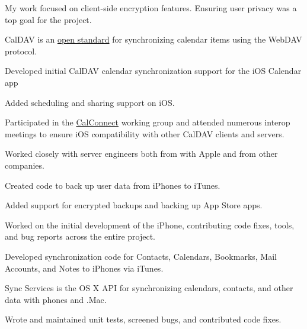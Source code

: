 \begin{cventries}
{\begin{cvsubentries}
{\begin{cvitems}
			\item {My work focused on client-side encryption features. Ensuring user privacy was a top goal for the project.}
         	 \end{cvitems}
        		}
       		{CalDAV is an \href{https://tools.ietf.org/html/rfc4791}{open standard} for synchronizing calendar items using the WebDAV protocol.
		\vspace{2.0mm}
		\begin{cvitems}
         		\item {Developed initial CalDAV calendar synchronization support for the iOS Calendar app}
			\item {Added scheduling and sharing support on iOS.} 
         		\item {Participated in the \href{https://www.calconnect.org}{CalConnect} working group and attended numerous interop meetings to ensure iOS compatibility with other CalDAV clients and servers.}
			\item {Worked closely with server engineers both from with Apple and from other companies.}
         	 \end{cvitems}
        		}
       		{
		\vspace{-2.0mm}
		\begin{cvitems}
         		\item {Created code to back up user data from iPhones to iTunes.}
			\item {Added support for encrypted backups and backing up App Store apps.}
         	 \end{cvitems}
        		}
       		{
		\vspace{-2.0mm}
		\begin{cvitems}
			\item {Worked on the initial development of the iPhone, contributing code fixes, tools, and bug reports across the entire project.}
         		\item {Developed synchronization code for Contacts, Calendars, Bookmarks, Mail Accounts, and Notes to iPhones via iTunes.}
         	 \end{cvitems}
        		}
       		{Sync Services is the OS X API for synchronizing calendars, contacts, and other data with phones and .Mac.
		\vspace{2.0mm}
		\begin{cvitems}
         		\item {Wrote and maintained unit tests, screened bugs, and contributed code fixes.}
         	 \end{cvitems}
        		}
      	\end{cvsubentries}
    }
\end{cventries}